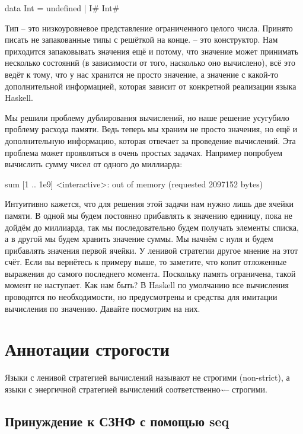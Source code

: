 \begin{code}
data Int = undefined  | I# Int# 
\end{code}

Тип  -- это низкоуровневое представление ограниченного целого
числа. Принято писать не запакованные типы с решёткой на конце. 
-- это конструктор. Нам приходится запаковывать значения ещё и потому,
что значение может принимать несколько состояний (в зависимости от того,
насколько оно вычислено), всё это ведёт к тому, что у нас хранится не
просто значение, а значение с какой-то дополнительной информацией,
которая зависит от конкретной реализации языка Haskell.

Мы решили проблему дублирования вычислений, но наше решение усугубило
проблему расхода памяти. Ведь теперь мы храним не просто значения, но
ещё и дополнительную информацию, которая отвечает за проведение
вычислений. Эта проблема может проявляться в очень простых задачах.
Например попробуем вычислить сумму чисел от одного до миллиарда:


\begin{code}
sum [1 .. 1e9]
<interactive>: out of memory (requested 2097152 bytes)
\end{code}

Интуитивно кажется, что для решения этой задачи нам нужно лишь две
ячейки памяти. В одной мы будем постоянно прибавлять к значению единицу,
пока не дойдём до миллиарда, так мы последовательно будем получать
элементы списка, а в другой мы будем хранить значение суммы. Мы начнём с
нуля и будем прибавлять значения первой ячейки. У ленивой стратегии
другое мнение на этот счёт. Если вы вернётесь к примеру выше, то
заметите, что  копит отложенные выражения до самого последнего
момента. Поскольку память ограничена, такой момент не наступает. Как нам
быть? В Haskell по умолчанию все вычисления проводятся по необходимости,
но предусмотрены и средства для имитации вычисления по значению. Давайте
посмотрим на них.

\section{Аннотации строгости}

Языки с ленивой стратегией вычислений называют не строгими (non-strict),
а языки с энергичной стратегией вычислений
соответственно\textasciitilde{}-- строгими.

\subsection{Принуждение к СЗНФ с помощью seq}

